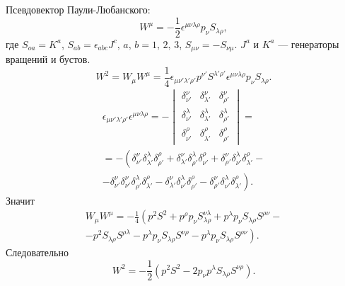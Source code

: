 \documentclass[a4paper]{article}
\begin{document}
\begin{sol}
Псевдовектор Паули-Любанского:
\[
W^\mu= -\frac{1}{2}\epsilon ^{\mu\nu\lambda\rho}
p_\nu S_{\lambda\rho}
,\]
где $S_{oa}=K^a$, $S_{ab}=\epsilon _{abc}J^c$,
$a,\,b=1,\,2,\,3$, $S_{\mu\nu}=-S_{\nu\mu}$.
$J^a$ и $K^a$ --- генераторы вращений и бустов.
 \[
W^2=W_\mu W^\mu= \frac{1}{4} \epsilon _{\mu\nu'\lambda'\rho'}p^{\nu'}S^{\lambda'\rho'}
\epsilon ^{\mu\nu\lambda\rho}p_\nu S_{\lambda\rho}
.\] 
\begin{multline*}
\epsilon _{\mu\nu'\lambda'\rho'}\epsilon ^{
\mu\nu\lambda\rho}=-
\begin{vmatrix} \delta_{\nu'}^\nu &
\delta_{\lambda'}^\nu & \delta_{\rho'}^\nu\\
\delta_{\nu'}^\lambda & \delta_{\lambda'}^\lambda & \delta_{\rho'}^\lambda\\
\delta_{\nu'}^\rho& \delta_{\lambda'}^\rho & \delta_{\rho'}^\rho\end{vmatrix} =\\=
-\left( \delta_{\nu'}^\nu \delta_{\lambda'}^\lambda
\delta_{\rho'}^\rho +\delta_{\lambda'}^\nu
\delta_{\rho'}^{\lambda}\delta_{\nu'}^\rho+
\delta_{\rho'}^\nu \delta_{\nu'}^\lambda
\delta_{\lambda'}^\rho\right. - \\ - \left. \delta_{\nu'}^\nu
\delta_{\nu'}^\nu\delta_{\rho'}^\lambda \delta_{\lambda'}^\rho-
\delta_{\lambda'}^\nu \delta_{\nu'}^\lambda
\delta_{\rho'}^\rho-
\delta_{\rho'}^\nu \delta_{\nu'}^\lambda
\delta_{\lambda'}^\rho\right) 
.\end{multline*} 
Значит
\begin{multline*}
	W_\mu W^\mu = -\frac{1}{4} \left( 
	p^2 S^2 + p^\rho p_\nu
S_{\lambda\rho}^{\nu\lambda}
+p^\lambda p_\nu S_{\lambda\rho}
S^{\rho \nu}\right. - \\ - \left.
p^2 S_{\lambda\rho} S^{\rho\lambda}
-p^\lambda p_\nu S_{\lambda \rho}
S^{\nu \rho}
-p^\lambda p_\nu S_{\lambda \rho
}S^{\rho \nu}\right) 
.\end{multline*} 
Следовательно
\[
	W^2= -\frac{1}{2} \left( 
	p^2 S^2-2p_\nu p^\lambda S_{\lambda\rho}
S^{\nu\rho}\right) 
.\] 
\end{sol}
\begin{hiProb}[9]
\end{hiProb}
\end{document}
